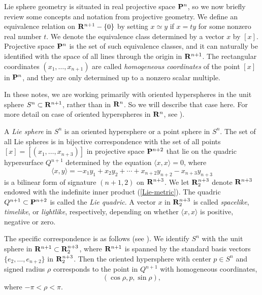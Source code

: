 \documentclass[12pt]{article}
\begin{document}
Lie sphere geometry is situated in real projective space ${\bf P}^n$,
so we now briefly review some concepts and notation from projective geometry.
We define an equivalence relation on ${\bf R}^{n+1} - \{0\}$ by setting
$x \simeq y$ if $x = ty$ for some nonzero real number $t$.  We denote
the equivalence class determined by a vector $x$ by $[x]$.  Projective
space ${\bf P}^n$ is the set of such equivalence classes, and it can
naturally be identified with the space of all lines through the origin
in ${\bf R}^{n+1}$.  The rectangular coordinates $(x_1, \ldots, x_{n+1})$
are called {\em homogeneous coordinates}
of the point $[x]$ in ${\bf P}^n$, and they
are only determined up to a nonzero scalar multiple.  

In these notes, we are working primarily with oriented hyperspheres in the unit sphere $S^n \subset {\bf R}^{n+1}$,
rather than in ${\bf R}^n$. 
So we will describe that case here.  For more detail on case of oriented hyperspheres in ${\bf R}^n$,
see \cite[pp. 14--23]{Cec1}).




A {\em Lie sphere} in $S^n$ is an oriented hypersphere or a point sphere in $S^n$.
The set of all Lie spheres
is in bijective correspondence with the set of all points $[x] = [(x_1,\ldots,x_{n+3})]$
in projective space ${\bf P}^{n+2}$ that lie
on the quadric hypersurface $Q^{n+1}$ 
determined by the equation 
$\langle x, x \rangle = 0$, where
\begin{equation}
\label{Lie-metric}
\langle x, y \rangle = -x_1 y_1 + x_2 y_2 + \cdots +x_{n+2} y_{n+2} - x_{n+3} y_{n+3}
\end{equation}
is a bilinear form of signature $(n+1,2)$ on ${\bf R}^{n+3}$.  
We let  ${\bf R}^{n+3}_2$ denote ${\bf R}^{n+3}$ endowed with
the indefinite inner product (\ref{Lie-metric}).  The quadric 
$Q^{n+1} \subset {\bf P}^{n+2}$  is called the {\em Lie quadric}. A vector $x$ in ${\bf R}^{n+3}_2$ is called {\em spacelike},
{\em timelike}, or {\em lightlike}, respectively, depending on whether $\langle x, x \rangle$ is positive, negative or zero.


The specific correspondence is as follows (see \cite[pp. 16--18]{Cec1}).  We identify $S^n$ 
with the unit sphere in ${\bf R}^{n+1} \subset {\bf R}^{n+3}_2$, where ${\bf R}^{n+1}$ is spanned by the 
standard basis vectors $\{e_2,\ldots,e_{n+2}\}$ in ${\bf R}^{n+3}_2$.
Then the oriented hypersphere with center $p \in S^n$ and
signed radius $\rho$ corresponds to the point in $Q^{n+1}$ with homogeneous coordinates,
\begin{equation}
\label{eq:1.4.4}
(\cos \rho , p, \sin \rho ),
\end{equation}
where $ - \pi < \rho < \pi$.
\end{document}
